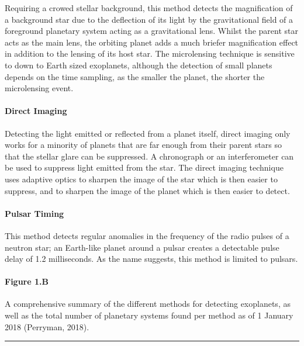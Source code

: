 \documentclass[11pt]{article}
\begin{document}
Requiring a crowed stellar background, this method detects the
magnification of a background star due to the deflection of its light by
the gravitational field of a foreground planetary system acting as a
gravitational lens. Whilst the parent star acts as the main lens, the
orbiting planet adds a much briefer magnification effect in addition to
the lensing of its host star. The microlensing technique is sensitive to
down to Earth sized exoplanets, although the detection of small planets
depends on the time sampling, as the smaller the planet, the shorter the
microlensing event.

\hypertarget{direct-imaging}{%
\paragraph{Direct Imaging}\label{direct-imaging}}

Detecting the light emitted or reflected from a planet itself, direct
imaging only works for a minority of planets that are far enough from
their parent stars so that the stellar glare can be suppressed. A
chronograph or an interferometer can be used to suppress light emitted
from the star. The direct imaging technique uses adaptive optics to
sharpen the image of the star which is then easier to suppress, and to
sharpen the image of the planet which is then easier to detect.

\hypertarget{pulsar-timing}{%
\paragraph{Pulsar Timing}\label{pulsar-timing}}

This method detects regular anomalies in the frequency of the radio
pulses of a neutron star; an Earth-like planet around a pulsar creates a
detectable pulse delay of 1.2 milliseconds. As the name suggests, this
method is limited to pulsars.

    \hypertarget{figure-1.b}{%
\paragraph{Figure 1.B}\label{figure-1.b}}

A comprehensive summary of the different methods for detecting
exoplanets, as well as the total number of planetary systems found per
method as of 1 January 2018 (Perryman, 2018).

\pagebreak

\begin{center}\rule{0.5\linewidth}{0.5pt}\end{center}
\end{document}
